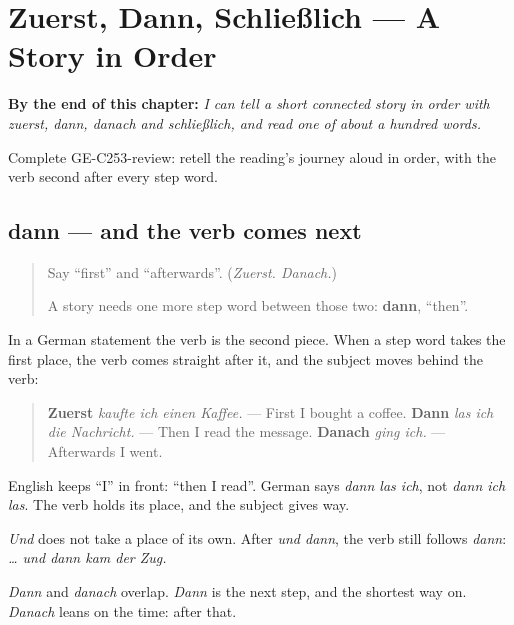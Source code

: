 
\chapter{Zuerst, Dann, Schließlich — A Story in Order}
\label{ch:ge-a-story-in-order}

\begin{chapteropening}
\textbf{By the end of this chapter:} \emph{I can tell a short connected story in order with zuerst, dann, danach and schließlich, and read one of about a hundred words.}

Complete GE-C253-review: retell the reading's journey aloud in order, with the verb second after every step word.
\end{chapteropening}

\section[zuerst, dann, danach]{dann — and the verb comes next}

\label{lesson:GE-C253-dann}



\begin{quote}
Say \textquotedblleft{}first\textquotedblright{} and \textquotedblleft{}afterwards\textquotedblright{}. (\emph{Zuerst. Danach.})

A story needs one more step word between those two: \textbf{dann}, \textquotedblleft{}then\textquotedblright{}.
\end{quote}

\begin{grammarlens}[title={Grammar Lens: the step word, then the verb}]
In a German statement the verb is the second piece. When a step word takes the first place, the verb comes straight after it, and the subject moves behind the verb:

\begin{quote}
\textbf{Zuerst} \emph{kaufte ich einen Kaffee.} — First I bought a coffee. \textbf{Dann} \emph{las ich die Nachricht.} — Then I read the message. \textbf{Danach} \emph{ging ich.} — Afterwards I went.
\end{quote}

English keeps \textquotedblleft{}I\textquotedblright{} in front: \textquotedblleft{}then I read\textquotedblright{}. German says \emph{dann las ich}, not \emph{dann ich las}. The verb holds its place, and the subject gives way.

\emph{Und} does not take a place of its own. After \emph{und dann}, the verb still follows \emph{dann}: \emph{… und dann kam der Zug.}

\emph{Dann} and \emph{danach} overlap. \emph{Dann} is the next step, and the shortest way on. \emph{Danach} leans on the time: after that.
\end{grammarlens}

